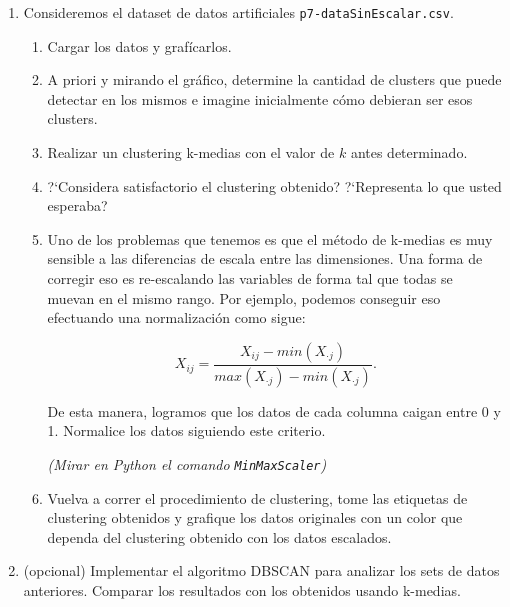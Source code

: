 \documentclass[a4paper,11pt]{article}
\theoremstyle{definition}
\begin{document}
\begin{enumerate}
\item Consideremos el dataset de datos artificiales \texttt{p7-dataSinEscalar.csv}.
\begin{enumerate}
	\item Cargar los datos  y graf\'icarlos.
	\item A priori y mirando el gr\'afico, determine la cantidad de clusters que puede detectar en los mismos e imagine inicialmente c\'omo debieran ser esos clusters.
	\item Realizar un clustering k-medias con el valor de $k$ antes determinado.
	\item ?`Considera satisfactorio el clustering obtenido? ?`Representa lo que usted esperaba?
	\item Uno de los problemas que tenemos es que el m\'etodo de k-medias es muy sensible a las diferencias de escala entre las dimensiones. Una forma de corregir eso es re-escalando las variables de
	forma tal que todas se muevan en el mismo rango. Por ejemplo, podemos conseguir eso efectuando una normalizaci\'on como sigue:
	
	$$
	X_{ij} = \frac{X_{ij} - min(X_{\cdot j}) }{max(X_{\cdot j}) - min(X_{\cdot j})}.
	$$
	
	De esta manera, logramos que los datos de cada columna caigan entre 0 y 1. Normalice los datos siguiendo este criterio.
	
	\textit{(Mirar en Python el comando \texttt{MinMaxScaler})}
	\item Vuelva a correr el procedimiento de clustering, tome las etiquetas de clustering obtenidos y grafique los datos originales con un color que dependa del clustering obtenido con los datos escalados.
	
\end{enumerate}


\item (opcional) Implementar el algoritmo DBSCAN para analizar los sets de datos anteriores. Comparar los resultados con los obtenidos usando k-medias.





\end{enumerate}
\end{document}
